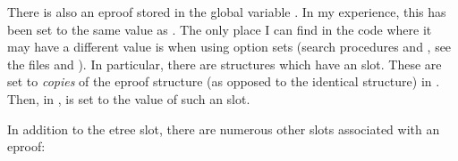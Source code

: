 There is also an eproof stored in the global variable .
In my experience, this has been set to the same value as .
The only place I can find in the code where
it may have a different value is when using option sets (search procedures 
and ,
see the files  and ).
In particular, there are  structures which have an  slot.
These are set to {\it copies} of the eproof structure (as opposed to the identical
structure) in .  Then, in ,
 is set to the value of such an  slot.

In addition to the etree slot,
there are numerous other slots associated with an eproof:
